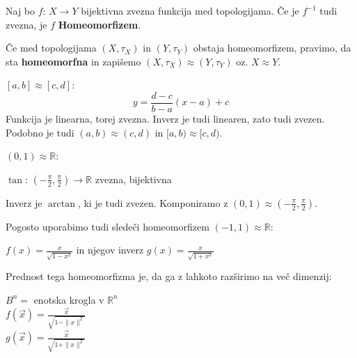 \documentclass[11pt, a4paper]{article}
\begin{document}
    \begin{definition}[Homeomorfizem]
        Naj bo \(f\): \(X \to Y\) bijektivna zvezna funkcija med topologijama. Če je \(f^{-1}\) tudi zvezna, je \(f\) \textbf{Homeomorfizem}.

        \par
        Če med topologijama \((X,\tau_X)\) in \((Y,\tau_Y)\) obstaja homeomorfizem, pravimo, da sta \textbf{homeomorfna} in zapišemo \((X,\tau_X) \approx (Y,\tau_Y)\) oz. \(X \approx Y\).
    \end{definition}

    \begin{example}
        \([a,b] \approx [c,d]\):
        \[y = \frac{d - c}{b - a} (x-a) + c\]
        Funkcija je linearna, torej zvezna. Inverz je tudi linearen, zato tudi zvezen. Podobno je tudi \((a,b) \approx (c,d)\) in \([a,b) \approx [c,d)\).
    \end{example}

    \begin{example}
        \((0,1) \approx \mathbb{R} \):
        \begin{center}
            \(\tan\): \((-\frac{\pi}{2},\frac{\pi}{2}) \to \mathbb{R}\) zvezna, bijektivna
        \end{center}
        Inverz je \(\arctan\), ki je tudi zvezen. Komponiramo z \((0,1) \approx (-\frac{\pi}{2},\frac{\pi}{2})\).
        \par
        Pogosto uporabimo tudi sledeči homeomorfizem \((-1,1) \approx \mathbb{R}\):
        \begin{center}
            \(f(x) = \frac{x}{\sqrt{1-x^2}}\) in njegov inverz \(g(x) = \frac{x}{\sqrt{1+x^2}}\)
        \end{center}
        Prednost tega homeomorfizma je, da ga z lahkoto razširimo na več dimenzij:
        \begin{center}
            \(B^n =\) enotska krogla v \(\mathbb{R}^n\) \\
            \(f(\vec{x}) = \frac{\vec{x}}{\sqrt{1 - \parallel x \parallel^2}}\) \\
            \(g(\vec{x}) = \frac{\vec{x}}{\sqrt{1 + \parallel x \parallel^2}}\)
        \end{center}
    \end{example}
\end{document}
